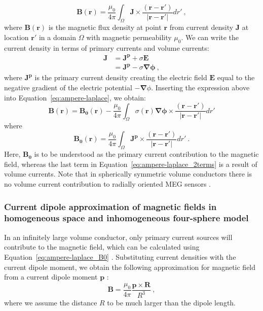 \documentclass[preprint,10pt,authoryear]{elsarticle}
\begin{document}
\begin{equation} \label{eq:ampere-laplace}
\mathbf{B}(\mathbf{r}) = \frac{\mu_0}{4 \pi} \int_{\Omega} \mathbf{J} \times \frac{(\mathbf{r} - \mathbf{r'})}{|\mathbf{r} - \mathbf{r'}|} dr'~,
\end{equation}
where $\mathbf{B}(\mathbf{r})$ is the magnetic flux density at point $\mathbf{r}$ from current density $\mathbf{J}$ at location $\mathbf{r'}$ in a domain $\Omega$ with magnetic permeability $\mu_0$.
We can write the current density in terms of primary currents and volume currents:
\begin{align*}
\mathbf{J} &= \mathbf{J^p} + \sigma\mathbf{E} \\
&= \mathbf{J^p} - \sigma\mathbf{\nabla \phi}~,
\end{align*}
where $\mathbf{J^p}$ is the primary current density creating the electric field $\mathbf{E}$ equal to the negative gradient of the electric potential $-\mathbf{\nabla} \phi$. Inserting the expression above into Equation~\eqref{eq:ampere-laplace}, we obtain:
\begin{equation} \label{eq:ampere-laplace_2terms}
\mathbf{B}(\mathbf{r}) = \mathbf{B_0}(\mathbf{r}) - \frac{\mu_0}{4 \pi} \int_{\Omega} \sigma(\mathbf{r})\mathbf{\nabla \phi} \times \frac{(\mathbf{r} - \mathbf{r'})}{|\mathbf{r} - \mathbf{r'}|} dr'
\end{equation}
where
\begin{equation} \label{eq:ampere-laplace_B0}
\mathbf{B_0}(\mathbf{r}) = \frac{\mu_0}{4 \pi} \int_{\Omega} \mathbf{J^p} \times \frac{(\mathbf{r} - \mathbf{r'})}{|\mathbf{r} - \mathbf{r'}|} dr'~.
\end{equation}
Here, $\mathbf{B_0}$ is to be understood as the primary current contribution to the magnetic field, whereas the last term in Equation~\eqref{eq:ampere-laplace_2terms} is a result of volume currents. Note that in spherically symmetric volume conductors there is no volume current contribution to radially oriented MEG sensors \citep{HAMALAINEN1993,NUNEZ2006}.

\subsubsection{Current dipole approximation of magnetic fields in homogeneous space and inhomogeneous four-sphere model}
In an infinitely large volume conductor, only primary current sources will contribute to the magnetic field, which can be calculated using Equation~\eqref{eq:ampere-laplace_B0}  \citep{NUNEZ2006,HAMALAINEN1993}. Substituting current densities with the current dipole moment, we obtain the following approximation for magnetic field from a current dipole moment $\mathbf{p}$ \citep{NUNEZ2006}:
\begin{equation}\label{eq:ampere_laplace_dipole}
\mathbf{B} = \frac{\mu_0}{4 \pi}\frac{\mathbf{p \times R}}{R^3}~, 
\end{equation}
where we assume the distance $R$ to be much larger than the dipole length.
\end{document}

